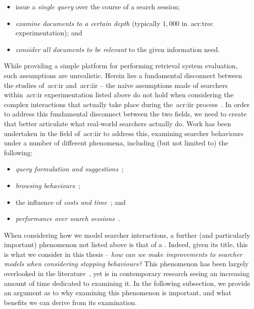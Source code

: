 \begin{itemize}
    \item{issue a \emph{single query} over the course of a search session;}
    \item{\emph{examine documents to a certain depth} (typically $1,000$ in~\gls{acr:trec} experimentation); and}
    \item{\emph{consider all documents to be relevant} to the given information need.}
\end{itemize}

While providing a simple platform for performing retrieval system evaluation, such assumptions are unrealistic. Herein lies a fundamental disconnect between the studies of~\gls{acr:ir} and~\gls{acr:iir} -- the na\"{i}ve assumptions made of searchers within~\gls{acr:ir} experimentation listed above do not hold when considering the complex interactions that actually take place during the~\gls{acr:iir} process~\citep{ingwersen2005theturn}. In order to address this fundamental disconnect between the two fields, we need to create  that better articulate what real-world searchers actually do. Work has been undertaken in the field of~\gls{acr:iir} to address this, examining searcher behaviours under a number of different phenomena, including (but not limited to) the following:

\begin{itemize}
    \item{\emph{query formulation and suggestions}~\citep{azzopardi2009query_side, azzopardi2007languages, baskaya2013behavioural_factors, carterette2015test_collections, jordan2006cqg, keskustalo2009querying, verberne2015personalised_queries};}
    \item{\emph{browsing behaviours}~\citep{carterette2015test_collections, chuklin2015click_models, guo2009click_chain, pakkonen2015behavioural_dimensions, smucker2011user_strategies};}
    \item{the influence of \emph{costs and time}~\citep{azzopardi2011economics, baskaya2013behavioural_factors}; and}
    \item{\emph{performance over search sessions}~\citep{luo2014winwin, luo2015pomdp}.}
\end{itemize}

When considering how we model searcher interactions, a further (and particularly important) phenomenon not listed above is that of a . Indeed, given its title, this is what we consider in this thesis -- \emph{how can we make improvements to searcher models when considering stopping behaviours?} This phenomenon has been largely overlooked in the literature~\citep{maxwell2015stopping_strategies}, yet is in contemporary research seeing an increasing amount of time dedicated to examining it. In the following subsection, we provide an argument as to why examining this phenomenon is important, and what benefits we can derive from its examination.

